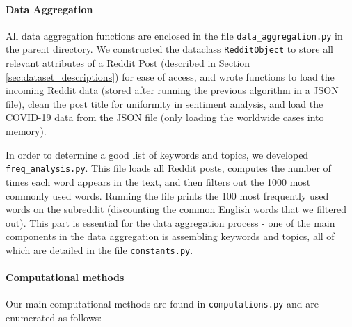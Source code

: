 \documentclass[fontsize=11pt]{article}
\begin{document}
\paragraph{Data Aggregation}
    
    All data aggregation functions are enclosed in the file \texttt{data\_aggregation.py} in the parent directory. We constructed the dataclass \texttt{RedditObject} to store all relevant attributes of a Reddit Post (described in Section \ref{sec:dataset_descriptions}) for ease of access, and wrote functions to load the incoming Reddit data (stored after running the previous algorithm in a JSON file), clean the post title for uniformity in sentiment analysis, and load the COVID-19 data from the JSON file (only loading the worldwide cases into memory).
    
    In order to determine a good list of keywords and topics, we developed \texttt{freq\_analysis.py}. This file loads all Reddit posts, computes the number of times each word appears in the text, and then filters out the 1000 most commonly used words. Running the file prints the 100 most frequently used words on the subreddit (discounting the common English words that we filtered out). This part is essential for the data aggregation process - one of the main components in the data aggregation is assembling keywords and topics, all of which are detailed in the file \texttt{constants.py}.
    
\paragraph{Computational methods}

Our main computational methods are found in \texttt{computations.py} and are enumerated as follows: 
\end{document}
